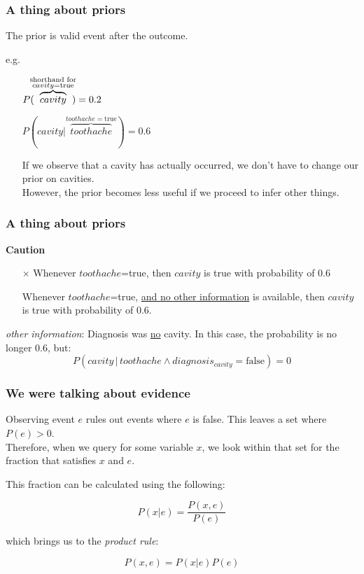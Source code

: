\begin{frame}\frametitle{A thing about priors}

The prior is valid event after the outcome.

e.g.\\
\begin{itemize}
 \item[] $P( \kern-1ex \overbrace{cavity}^{\substack{\text{shorthand for}\\{cavity}=\text{true}}} \kern-1ex) = 0.2$
 \item[] $P(cavity | \overbrace{toothache}^{{toothache}=\text{true}}) = 0.6$
 \item[] If we observe that a cavity has actually occurred, we don't have to change our prior on cavities.\\
 However, the prior becomes less useful if we proceed to infer other things.
\end{itemize}


\end{frame}

\begin{frame}\frametitle{A thing about priors}
    
\textbf{Caution}\\
\begin{itemize}
\item[$\times$] Whenever $toothache$=true, then $cavity$ is true with probability of 0.6
\item[\checkmark] Whenever $toothache$=true, \underline{and no other information} is available, then $cavity$ is true with probability of 0.6.
\end{itemize}

\textit{other information}: Diagnosis was \underline{no} cavity. In this case, the probability is no longer 0.6, but:
\begin{equation}
P(cavity \,|\, toothache \wedge diagnosis_{cavity} = \text{false}) = 0
\end{equation}

\end{frame}

\begin{frame}\frametitle{We were talking about evidence}

Observing event $e$ rules out events where $e$ is false. This leaves a set where $P(e)>0$.\\
Therefore, when we query for some variable $x$,
we look within that set for the fraction that satisfies $x$ and $e$.

This fraction can be calculated using the following:

\begin{equation}
P(x|e) = \frac{P(x,e)}{P(e)}
\end{equation}

which brings us to the \emph{product rule}:

\begin{equation}
P(x,e) = P(x|e) P(e)
\label{eq:productrule}    
\end{equation}

\end{frame}

